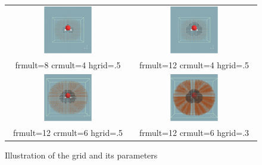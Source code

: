 \documentclass[a4paper,11pt]{report}
\begin{document}
\begin{figure}[h]             %
\begin{center}
\begin{tabular}{cc}
\includegraphics[width=0.4\textwidth]{grid100.pdf} &
\includegraphics[width=0.4\textwidth]{grid200.pdf} \\
frmult=8 crmult=4 hgrid=.5 & frmult=12 crmult=4 hgrid=.5 \\
\includegraphics[width=0.4\textwidth]{grid300.pdf} &
\includegraphics[width=0.4\textwidth]{grid400.pdf} \\
frmult=12 crmult=6 hgrid=.5 & frmult=12 crmult=6 hgrid=.3
\end{tabular}
\end{center}
\label{grids}
\caption{Illustration of the grid and its parameters}
\end{figure}
\end{document}
